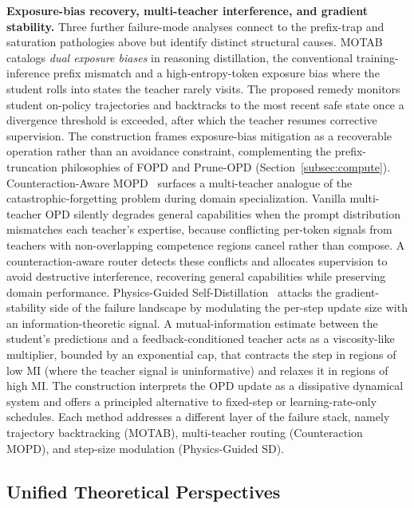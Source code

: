 \documentclass{article} %
\begin{document}
\textbf{Exposure-bias recovery, multi-teacher interference, and gradient stability.} Three further failure-mode analyses connect to the prefix-trap and saturation pathologies above but identify distinct structural causes. MOTAB~\citep{2605.19433} catalogs \emph{dual exposure biases} in reasoning distillation, the conventional training-inference prefix mismatch and a high-entropy-token exposure bias where the student rolls into states the teacher rarely visits. The proposed remedy monitors student on-policy trajectories and backtracks to the most recent safe state once a divergence threshold is exceeded, after which the teacher resumes corrective supervision. The construction frames exposure-bias mitigation as a recoverable operation rather than an avoidance constraint, complementing the prefix-truncation philosophies of FOPD and Prune-OPD (Section~\ref{subsec:compute}). Counteraction-Aware MOPD~\citep{2605.27115} surfaces a multi-teacher analogue of the catastrophic-forgetting problem during domain specialization. Vanilla multi-teacher OPD silently degrades general capabilities when the prompt distribution mismatches each teacher's expertise, because conflicting per-token signals from teachers with non-overlapping competence regions cancel rather than compose. A counteraction-aware router detects these conflicts and allocates supervision to avoid destructive interference, recovering general capabilities while preserving domain performance. Physics-Guided Self-Distillation~\citep{2606.03620} attacks the gradient-stability side of the failure landscape by modulating the per-step update size with an information-theoretic signal. A mutual-information estimate between the student's predictions and a feedback-conditioned teacher acts as a viscosity-like multiplier, bounded by an exponential cap, that contracts the step in regions of low MI (where the teacher signal is uninformative) and relaxes it in regions of high MI. The construction interprets the OPD update as a dissipative dynamical system and offers a principled alternative to fixed-step or learning-rate-only schedules. Each method addresses a different layer of the failure stack, namely trajectory backtracking (MOTAB), multi-teacher routing (Counteraction MOPD), and step-size modulation (Physics-Guided SD).

\subsection{Unified Theoretical Perspectives}
\label{subsec:theory}
\end{document}

